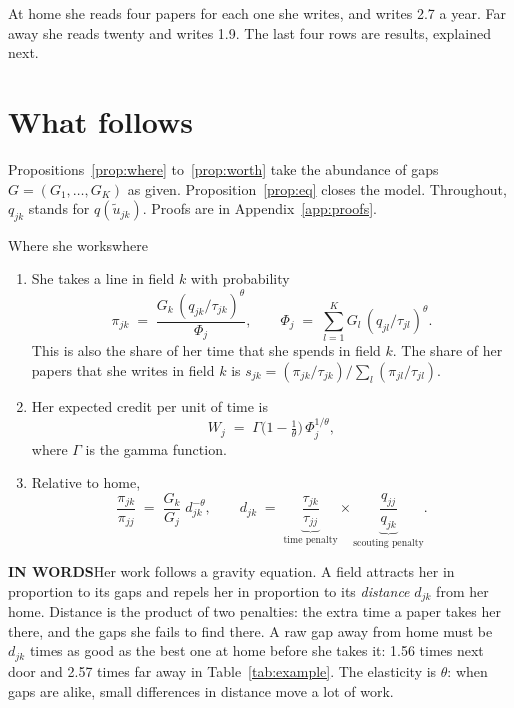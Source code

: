 \documentclass[11pt,letterpaper]{article}
\newcommand{\inwords}{{\sffamily\bfseries\footnotesize\color{hbluedark}IN WORDS}\enspace}
\newcommand{\ut}{\tilde u}
\begin{document}
At home she reads four papers for each one she writes, and writes 2.7 a year. Far away she reads twenty and writes 1.9. The last four rows are results, explained next.

\section{What follows}\label{sec:results}

Propositions~\ref{prop:where} to~\ref{prop:worth} take the abundance of gaps $G=(G_1,\dots,G_K)$ as given. Proposition~\ref{prop:eq} closes the model. Throughout, $q_{jk}$ stands for $q(\ut_{jk})$. Proofs are in Appendix~\ref{app:proofs}.

\begin{prop}{Where she works}{where}
\begin{enumerate}[label=(\roman*),leftmargin=2em]
\item She takes a line in field $k$ with probability
\begin{equation}\label{eq:pi}
\pi_{jk}\;=\;\frac{G_k\,(q_{jk}/\tau_{jk})^{\theta}}{\Phi_j},\qquad \Phi_j\;=\;\sum_{l=1}^{K}G_l\,(q_{jl}/\tau_{jl})^{\theta}.
\end{equation}
This is also the share of her time that she spends in field $k$. The share of her papers that she writes in field $k$ is $s_{jk}=(\pi_{jk}/\tau_{jk})\big/\sum_l(\pi_{jl}/\tau_{jl})$.
\item Her expected credit per unit of time is
\begin{equation}\label{eq:W}
W_j\;=\;\Gamma\!\big(1-\tfrac1\theta\big)\,\Phi_j^{1/\theta},
\end{equation}
where $\Gamma$ is the gamma function.
\item Relative to home,
\begin{equation}\label{eq:gravity}
\frac{\pi_{jk}}{\pi_{jj}}\;=\;\frac{G_k}{G_j}\;d_{jk}^{-\theta},\qquad d_{jk}\;=\;\underbrace{\frac{\tau_{jk}}{\tau_{jj}}}_{\text{time penalty}}\times\underbrace{\frac{q_{jj}}{q_{jk}}}_{\text{scouting penalty}} .
\end{equation}
\end{enumerate}
\tcblower
\inwords Her work follows a gravity equation. A field attracts her in proportion to its gaps and repels her in proportion to its \emph{distance} $d_{jk}$ from her home. Distance is the product of two penalties: the extra time a paper takes her there, and the gaps she fails to find there. A raw gap away from home must be $d_{jk}$ times as good as the best one at home before she takes it: 1.56 times next door and 2.57 times far away in Table~\ref{tab:example}. The elasticity is $\theta$: when gaps are alike, small differences in distance move a lot of work.
\end{prop}
\end{document}
